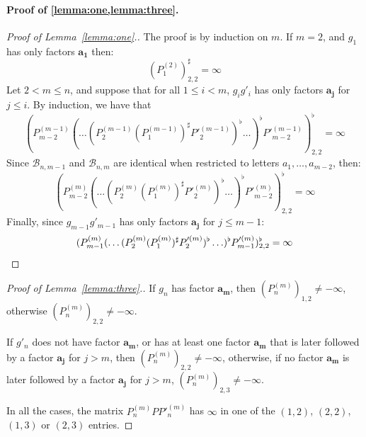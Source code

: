 \documentclass{lmcs}
\theoremstyle{remark}
\theoremstyle{remark}
\begin{document}
\paragraph{Proof of \cref{lemma:one,lemma:three}.}
\begin{proof}[Proof of Lemma~\ref{lemma:one}.]
The proof is by induction on $m$.
If $m = 2$, and $g_1$ has only factors $\boldsymbol{a_1}$ then:
$$(P^{(2)}_1)^\sharp_{2,2} = \infty$$
Let $2<m \leq n$, and suppose that for all $1\leq i < m$, $g_ig'_i$ has only factors $\boldsymbol{a_j}$ for $j\leq i$. By induction, we have that 
$$(P^{(m-1)}_{m-2} (\ldots (P^{(m-1)}_2 (P^{(m-1)}_1)^\sharp P'^{(m-1)}_2)^\flat \ldots)^\flat P'^{(m-1)}_{m-2})^\flat_{2,2} = \infty$$
Since $\mathcal{B}_{n,m-1}$ and $\mathcal{B}_{n,m}$ are identical when restricted to letters $a_1, \ldots, a_{m-2}$, then:
$$(P^{(m)}_{m-2} (\ldots (P^{(m)}_2 (P^{(m)}_1)^\sharp P'^{(m)}_2)^\flat \ldots)^\flat P'^{(m)}_{m-2})^\flat_{2,2} = \infty$$
Finally, since $g_{m-1}g'_{m-1}$ has only factors $\boldsymbol{a_j}$ for $j\leq m-1$:
\begin{equation*}(P^{(m)}_{m-1} (\ldots (P^{(m)}_2 (P^{(m)}_1)^\sharp P'^{(m)}_2)^\flat \ldots)^\flat P'^{(m)}_{m-1})^\flat_{2,2} = \infty\qedhere
\end{equation*}
\end{proof}


\begin{proof}[Proof of Lemma~\ref{lemma:three}.]
If $g_{n}$ has factor $\boldsymbol{a_m}$, then $(P^{(m)}_{n})_{1,2} \neq -\infty$, otherwise $(P^{(m)}_{n})_{2,2} \neq -\infty$. 

If $g'_{n}$ does not have factor $\boldsymbol{a_m}$, or has at least one factor $\boldsymbol{a_m}$ that is later followed by a factor $\boldsymbol{a_j}$ for $j>m$, then $(P^{(m)}_{n})_{2,2} \neq -\infty$, otherwise, if no factor $\boldsymbol{a_m}$ is later followed by a factor $\boldsymbol{a_j}$ for $j>m$, $(P^{(m)}_{n})_{2,3} \neq -\infty$. 

In all the cases, the matrix $P^{(m)}_{n} P P'^{(m)}_{n}$ has $\infty$ in one of the $(1,2)$, $(2,2)$, $(1,3)$ or $(2,3)$ entries.
\end{proof}
\end{document}

